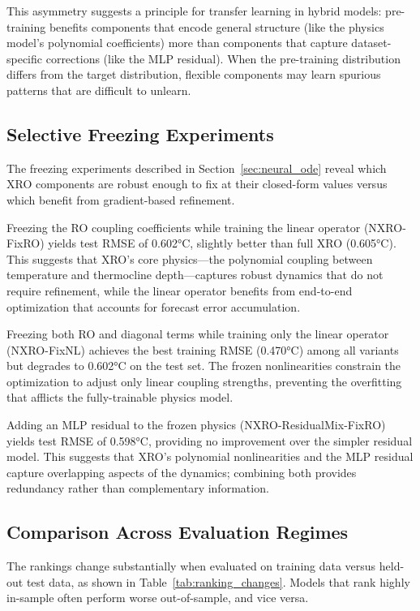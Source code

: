 This asymmetry suggests a principle for transfer learning in hybrid models: pre-training benefits components that encode general structure (like the physics model's polynomial coefficients) more than components that capture dataset-specific corrections (like the MLP residual). When the pre-training distribution differs from the target distribution, flexible components may learn spurious patterns that are difficult to unlearn.

\subsection{Selective Freezing Experiments}

The freezing experiments described in Section~\ref{sec:neural_ode} reveal which XRO components are robust enough to fix at their closed-form values versus which benefit from gradient-based refinement.

Freezing the RO coupling coefficients while training the linear operator (NXRO-FixRO) yields test RMSE of 0.602°C, slightly better than full XRO (0.605°C). This suggests that XRO's core physics---the polynomial coupling between temperature and thermocline depth---captures robust dynamics that do not require refinement, while the linear operator benefits from end-to-end optimization that accounts for forecast error accumulation.

Freezing both RO and diagonal terms while training only the linear operator (NXRO-FixNL) achieves the best training RMSE (0.470°C) among all variants but degrades to 0.602°C on the test set. The frozen nonlinearities constrain the optimization to adjust only linear coupling strengths, preventing the overfitting that afflicts the fully-trainable physics model.

Adding an MLP residual to the frozen physics (NXRO-ResidualMix-FixRO) yields test RMSE of 0.598°C, providing no improvement over the simpler residual model. This suggests that XRO's polynomial nonlinearities and the MLP residual capture overlapping aspects of the dynamics; combining both provides redundancy rather than complementary information.

\subsection{Comparison Across Evaluation Regimes}

The rankings change substantially when evaluated on training data versus held-out test data, as shown in Table~\ref{tab:ranking_changes}. Models that rank highly in-sample often perform worse out-of-sample, and vice versa.

